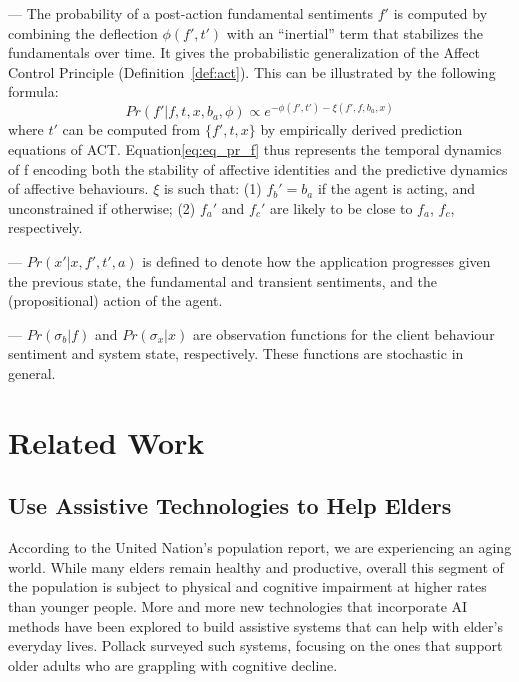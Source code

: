 --- The probability of a post-action fundamental sentiments $f'$ is computed by combining the deflection $\phi(f',t')$ with an ``inertial'' term that stabilizes the fundamentals over time. It gives the probabilistic generalization of the Affect Control Principle (Definition~\ref{def:act}). This can be illustrated by the following formula:
\begin{equation}\label{eq:eq_pr_f}
Pr(f'|f,t,x,b_{a},\phi) \propto e^{-\phi(f',t')-\xi(f',f,b_{a},x)} 
\end{equation}
where $t'$ can be computed from $\{f', t, x\}$ by empirically derived prediction equations of ACT. Equation\ref{eq:eq_pr_f} thus represents the temporal dynamics of f encoding both the stability of affective identities and the predictive dynamics of affective behaviours. $\xi$ is such that: (1) $f_{b}' = b_{a}$ if the agent is acting, and unconstrained if otherwise; (2) $f_{a}'$ and $f_{c}'$ are likely to be close to $f_{a}$, $f_{c}$, respectively.

--- $Pr(x'|x,f',t',a)$ is defined to denote how the application progresses given the previous state, the fundamental and transient sentiments, and the (propositional) action of the agent. 

--- $Pr(\sigma_{b}|f)$ and $Pr(\sigma_{x}|x)$ are observation functions for the client behaviour sentiment and system state, respectively. These functions are stochastic in general.

\section{Related Work}
\subsection{Use Assistive Technologies to Help Elders}

According to the United Nation's population report, we are experiencing an aging world. While many elders remain healthy and productive, overall this segment of the population is subject to physical and cognitive impairment at higher rates than younger people. More and more new technologies that incorporate AI methods have been explored to build assistive systems that can help with elder's everyday lives. Pollack \cite{pollack2005intelligent} surveyed such systems, focusing on the ones that support older adults who are grappling with cognitive decline.

